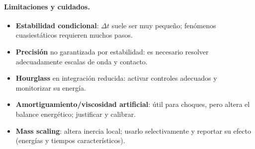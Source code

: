 \documentclass[11pt]{article} %
\begin{document}
\paragraph{Limitaciones y cuidados.}
\begin{itemize}
  \item \textbf{Estabilidad condicional}: $\Delta t$ suele ser muy pequeño; fenómenos cuasiestáticos requieren muchos pasos.
  \item \textbf{Precisión} no garantizada por estabilidad: es necesario resolver adecuadamente escalas de onda y contacto.
  \item \textbf{Hourglass} en integración reducida: activar controles adecuados y monitorizar su energía.
  \item \textbf{Amortiguamiento/viscosidad artificial}: útil para choques, pero altera el balance energético; justificar y calibrar.
  \item \textbf{Mass scaling}: altera inercia local; usarlo selectivamente y reportar su efecto (energías y tiempos característicos).
\end{itemize}

\end{document}
